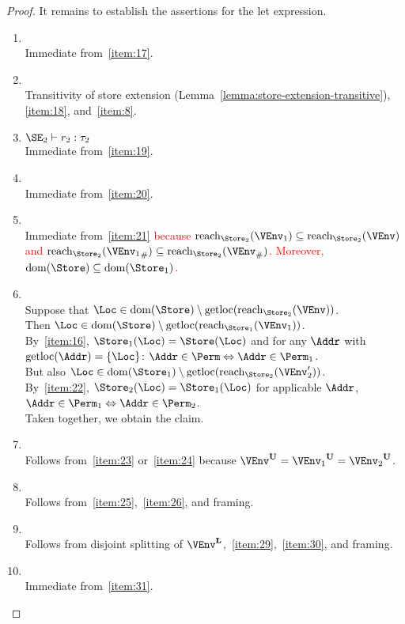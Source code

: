 \begin{proof}
  It remains to establish the assertions for the let expression.
  \begin{enumerate}[({R}-1)]
  \item {}
    \\ Immediate from~\ref{item:17}.
  \item {}
    \\ Transitivity of store extension
    (Lemma~\ref{lemma:store-extension-transitive}), \ref{item:18},
    and~\ref{item:8}.
  \item  $\SE_2 \vdash r_2 : \tau_2$
    \\ Immediate from~\ref{item:19}.
  \item {}
    \\ Immediate from~\ref{item:20}.
  \item {}
    \\ Immediate from~\ref{item:21}
    \textcolor{red}{because $\Reach{\Store_2}{\VEnv_1}
    \subseteq \Reach{\Store_2}{\VEnv} $ and
    $\Reach{\Store_2}{\Suspended{\VEnv_1}} \subseteq
    \Reach{\Store_2}{\Suspended\VEnv}$.
    Moreover, $\Dom\Store \subseteq \Dom{\Store_1}$.
  }
\item {}
    ~\\ Suppose that $\Loc \in \Dom\Store \setminus
    \Rawloc{\Reach{\Store_2}{\VEnv}}$.
    \\ Then $\Loc \in \Dom\Store \setminus
    \Rawloc{\Reach{\Store_1}{\VEnv_1}}$.
    \\ By~\ref{item:16}, $\Store_1 (\Loc) = \Store (\Loc)$ and for any
    $\Addr$ with $\Rawloc\Addr = \{\Loc\}$: $\Addr \in \Perm
    \Leftrightarrow \Addr \in \Perm_1$.
    \\ But also $\Loc \in \Dom{\Store_1} \setminus
    \Rawloc{\Reach{\Store_2}{\VEnv_2'}}$.
    \\ By~\ref{item:22}, $\Store_2 (\Loc) = \Store_1 (\Loc)$ for
    applicable $\Addr$, $\Addr \in \Perm_1
    \Leftrightarrow \Addr \in \Perm_2$.
    \\ Taken together, we obtain the claim.
  \item {}
    \\ Follows from~\ref{item:23} or~\ref{item:24} because
    $\ImmutableBorrows\VEnv = \ImmutableBorrows{\VEnv_1} =
    \ImmutableBorrows{\VEnv_2}$.
  \item {}
    \\ Follows from~\ref{item:25},~\ref{item:26}, and framing.
  \item {}
    \\ Follows from disjoint splitting of
    $\Active\VEnv$,~\ref{item:29},~\ref{item:30}, and framing.
  \item {}
    \\ Immediate from~\ref{item:31}.
  \end{enumerate}


\end{proof}
